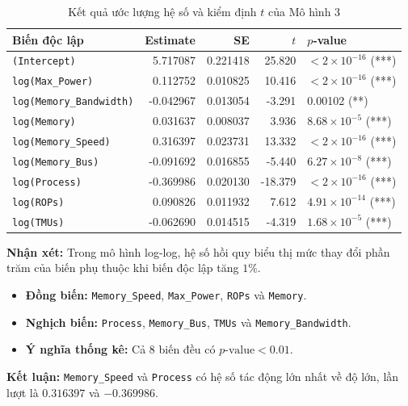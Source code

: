 \begin{table}[H]
\centering
\scriptsize
\renewcommand{\arraystretch}{1.1}
\setlength{\tabcolsep}{3pt}
\caption{Kết quả ước lượng hệ số và kiểm định $t$ của Mô hình 3}
\label{tab:he-so-model3}
\begin{tabularx}{\textwidth}{@{}X r r r p{2.5cm}@{}}
\toprule
\textbf{Biến độc lập} & \textbf{Estimate} & \textbf{SE} & \textbf{$t$} & \textbf{$p$-value} \\
\midrule
\texttt{(Intercept)} & 5.717087 & 0.221418 & 25.820 & $<2\times10^{-16}$ (***) \\
\texttt{log(Max\_Power)} & 0.112752 & 0.010825 & 10.416 & $<2\times10^{-16}$ (***) \\
\texttt{log(Memory\_Bandwidth)} & -0.042967 & 0.013054 & -3.291 & 0.00102 (**) \\
\texttt{log(Memory)} & 0.031637 & 0.008037 & 3.936 & $8.68\times10^{-5}$ (***) \\
\texttt{log(Memory\_Speed)} & 0.316397 & 0.023731 & 13.332 & $<2\times10^{-16}$ (***) \\
\texttt{log(Memory\_Bus)} & -0.091692 & 0.016855 & -5.440 & $6.27\times10^{-8}$ (***) \\
\texttt{log(Process)} & -0.369986 & 0.020130 & -18.379 & $<2\times10^{-16}$ (***) \\
\texttt{log(ROPs)} & 0.090826 & 0.011932 & 7.612 & $4.91\times10^{-14}$ (***) \\
\texttt{log(TMUs)} & -0.062690 & 0.014515 & -4.319 & $1.68\times10^{-5}$ (***) \\
\bottomrule
\end{tabularx}
\end{table}

\textbf{Nhận xét:} Trong mô hình log-log, hệ số hồi quy biểu thị mức thay đổi phần trăm của biến phụ thuộc khi biến độc lập tăng $1\%$.

\begin{itemize}
    \item \textbf{Đồng biến:} \texttt{Memory\_Speed}, \texttt{Max\_Power}, \texttt{ROPs} và \texttt{Memory}.
    \item \textbf{Nghịch biến:} \texttt{Process}, \texttt{Memory\_Bus}, \texttt{TMUs} và \texttt{Memory\_Bandwidth}.
    \item \textbf{Ý nghĩa thống kê:} Cả 8 biến đều có $p\text{-value}<0.01$.
\end{itemize}

\textbf{Kết luận:} \texttt{Memory\_Speed} và \texttt{Process} có hệ số tác động lớn nhất về độ lớn, lần lượt là $0.316397$ và $-0.369986$.

